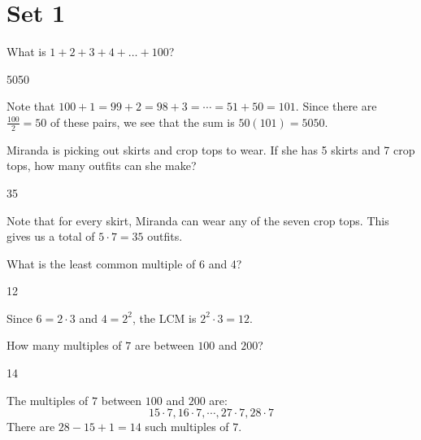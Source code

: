\documentclass[11pt]{article}
\begin{document}
\section*{Set 1}
\begin{problem}
What is $1 + 2 + 3 + 4 + \dots + 100$?
\end{problem}

\begin{answer}
5050
\end{answer}

\begin{solution}
Note that $100+1=99+2=98+3=\cdots=51+50=101$. Since there are $\frac{100}{2}=50$ of these pairs, we see that the sum is $50(101)=\boxed{5050}$.
\end{solution}


\begin{problem}
Miranda is picking out skirts and crop tops to wear. If she has 5 skirts and 7 crop tops, how many outfits can she make?
\end{problem}

\begin{answer}
35
\end{answer}

\begin{solution}
Note that for every skirt, Miranda can wear any of the seven crop tops. This gives us a total of $5 \cdot 7 = \boxed{35}$ outfits. 
\end{solution}


\begin{problem}
What is the least common multiple of 6 and 4?
\end{problem}

\begin{answer}
12
\end{answer}

\begin{solution}
Since $6=2\cdot 3$ and $4=2^2$, the LCM is $2^2 \cdot 3=\boxed{12}$.
\end{solution}


\begin{problem}
How many multiples of $7$ are between $100$ and $200$?
\end{problem}

\begin{answer}
14
\end{answer}

\begin{solution}
The multiples of $7$ between $100$ and $200$ are: \[ 15 \cdot 7, 16 \cdot 7, \cdots, 27 \cdot 7, 28 \cdot 7 \]
There are $28 - 15 + 1 = \boxed{14}$ such multiples of $7$.
\end{solution}
\end{document}
